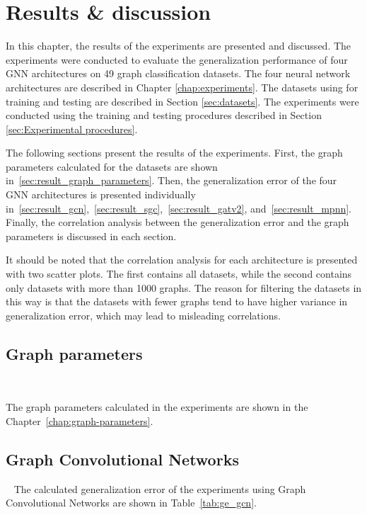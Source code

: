 \chapter{Results \& discussion}\label{chap:results}

In this chapter, the results of the experiments are presented and discussed. The experiments were conducted to evaluate the generalization performance of four GNN architectures on 49 graph classification datasets. The four neural network architectures are described in Chapter \ref{chap:experiments}. The datasets using for training and testing are described in Section \ref{sec:datasets}. The experiments were conducted using the training and testing procedures described in Section \ref{sec:Experimental procedures}.

The following sections present the results of the experiments. First, the graph parameters calculated for the datasets are shown in~\ref{sec:result_graph_parameters}. Then, the generalization error of the four GNN architectures is presented individually in~\ref{sec:result_gcn},~\ref{sec:result_sgc},~\ref{sec:result_gatv2}, and~\ref{sec:result_mpnn}. Finally, the correlation analysis between the generalization error and the graph parameters is discussed in each section.

It should be noted that the correlation analysis for each architecture is presented with two scatter plots. The first contains all datasets, while the second contains only datasets with more than 1000 graphs. The reason for filtering the datasets in this way is that the datasets with fewer graphs tend to have higher variance in generalization error, which may lead to misleading correlations.

\section{Graph parameters}~\label{sec:result_graph_parameters}

The graph parameters calculated in the experiments are shown in the Chapter~\ref{chap:graph-parameters}.

\section{Graph Convolutional Networks}~\label{sec:result_gcn}
The calculated generalization error of the experiments using Graph Convolutional Networks are shown in Table~\ref{tab:ge_gcn}.



